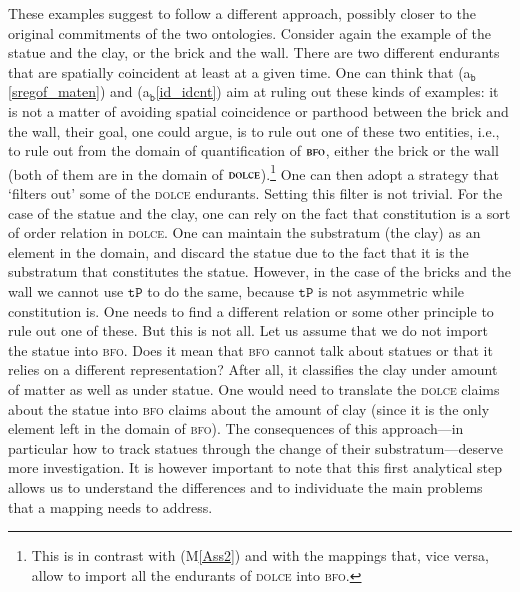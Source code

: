 \documentclass[ao]{iosart2x}
\newcommand{\nb}[1]{\textcolor{red}{$|$}\marginpar{\hspace*{-0cm}\parbox{20mm}{\scriptsize\raggedright\textcolor{red}{#1}}}}
\newcommand{\bfoAxLabel}{\textrm{a$_\texttt{b}$}}
\newcommand{\refbfoax}[1]{({\bfoAxLabel}\ref{#1})}
\newcommand{\pr}[1]{\mathtt{#1}}
\newcommand{\dolce}{{\textsc{dolce}}}
\newcommand{\bfo}{{\textsc{bfo}}}
\newcommand {\TPd} {\ensuremath{\pr{tP}}}
\begin{document}
These examples suggest to follow a different approach, possibly closer to the original commitments of the two ontologies. Consider again the example of the statue and the clay, or the brick and the wall. There are two different endurants that are spatially coincident at least at a given time. One can think that \refbfoax{sregof_maten} and \refbfoax{id_idcnt} aim at ruling out these kinds of examples: it is not a matter of avoiding spatial coincidence or parthood between the brick and the wall, their goal, one could argue, is to rule out one of these two entities, i.e., to rule out from the domain  of quantification of $\bfo$, either the brick or the wall (both of them are in the domain of $\dolce$).\footnote{This is in contrast with (M\ref{Ass2}) and with the mappings that, vice versa, allow to import all the endurants of {\dolce} into {\bfo}.}
One can then adopt a strategy that `filters out' some of the {\dolce} endurants. Setting this filter is not trivial. For the case of the statue and the clay, one can rely on the fact that constitution is a sort of order relation in {\dolce}. One can maintain the substratum (the clay) as an element in the domain, and discard the statue due to the fact that it is the substratum that constitutes the statue. However, in the case of the bricks and the wall we cannot use $\TPd$ to do the same, because $\TPd$ is not asymmetric while constitution is.
One needs to find a different relation or some other principle to rule out one of these. But this is not all. Let us assume that we do not import the statue into {\bfo}. Does it mean that {\bfo} cannot talk about statues or that it relies on a different representation? After all, it classifies the clay under amount of matter as well as under statue. One would need to translate the {\dolce} claims about the statue into {\bfo} claims about the amount of clay %
(since it is the only element left in the domain of {\bfo}). The consequences of this approach---in particular how to track statues through the change of their substratum---deserve more investigation.  It is however important to note that this first analytical step allows us to understand the differences and to individuate the main problems that a mapping needs to address.%
\end{document}
